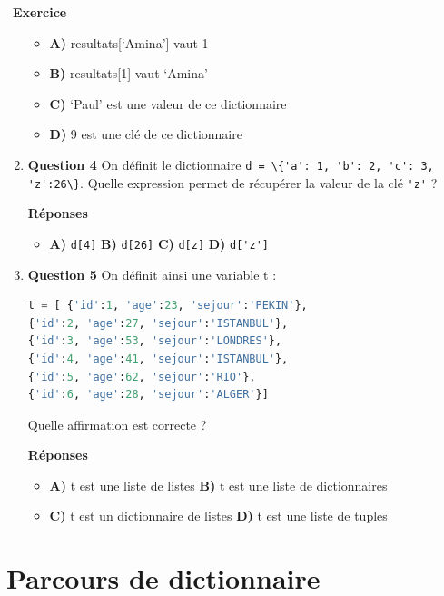 \documentclass[
  11pt,
]{article}
\newcommand{\passthrough}[1]{#1}
\providecommand{\tightlist}{%
  \setlength{\itemsep}{0pt}\setlength{\parskip}{0pt}}
\newcounter{exo}
\newenvironment{exercice}[1]
{\par \medskip   \addtocounter{exo}{1} \noindent  
\begin{bclogo}[arrondi =0.1,   noborder = true, logo=\bccrayon, marge=4]{~\textbf{Exercice} \textbf{\theexo} {\itshape #1} }  \par}
{
\end{bclogo}
 \par \bigskip }
\newcounter{cours}
\begin{document}
\begin{exercice}{}
\begin{enumerate}
  \begin{itemize}
  \item
    \textbf{A)} resultats{[}`Amina'{]} vaut 1
  \item
    \textbf{B)} resultats{[}1{]} vaut `Amina'
  \item
    \textbf{C)} `Paul' est une valeur de ce dictionnaire
  \item
    \textbf{D)} 9 est une clé de ce dictionnaire
  \end{itemize}
\item
  \textbf{Question 4} On définit le dictionnaire
  \passthrough{\lstinline!d = \{'a': 1, 'b': 2, 'c': 3, 'z':26\}!}.
  Quelle expression permet de récupérer la valeur de la clé
  \passthrough{\lstinline!'z'!} ?

  \textbf{Réponses}

  \begin{itemize}
  \tightlist
  \item
    \textbf{A)} \passthrough{\lstinline!d[4]!} \textbf{B)}
    \passthrough{\lstinline!d[26]!} \textbf{C)}
    \passthrough{\lstinline!d[z]!} \textbf{D)}
    \passthrough{\lstinline!d['z']!}
  \end{itemize}
\item
  \textbf{Question 5} On définit ainsi une variable t :

\begin{lstlisting}[language=Python]
t = [ {'id':1, 'age':23, 'sejour':'PEKIN'},
{'id':2, 'age':27, 'sejour':'ISTANBUL'},
{'id':3, 'age':53, 'sejour':'LONDRES'},
{'id':4, 'age':41, 'sejour':'ISTANBUL'},
{'id':5, 'age':62, 'sejour':'RIO'},
{'id':6, 'age':28, 'sejour':'ALGER'}]
\end{lstlisting}

  Quelle affirmation est correcte ?

  \textbf{Réponses}

  \begin{itemize}
  \item
    \textbf{A)} t est une liste de listes \textbf{B)} t est une liste de
    dictionnaires
  \item
    \textbf{C)} t est un dictionnaire de listes \textbf{D)} t est une
    liste de tuples
  \end{itemize}
\end{enumerate}

\end{exercice}

\hypertarget{parcours-de-dictionnaire}{%
\section{Parcours de dictionnaire}\label{parcours-de-dictionnaire}}
\end{document}
